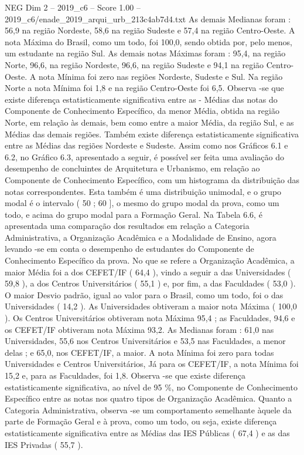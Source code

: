 \begin{textsample}{NEG Dim 2 – 2019\_c6 – Score 1.00 – 2019\_c6/enade\_2019\_arqui\_urb\_213c4ab7d4.txt}
As demais Medianas foram : 56,9 na região Nordeste, 58,6 na região Sudeste e 57,4 na região Centro-Oeste.
A nota Máxima do Brasil, como um todo, foi 100,0, sendo obtida por, pelo menos, um estudante na região Sul.
As demais notas Máximas foram : 95,4, na região Norte, 96,6, na região Nordeste, 96,6, na região Sudeste e 94,1 na região Centro-Oeste.
A nota Mínima foi zero nas regiões Nordeste, Sudeste e Sul.
Na região Norte a nota Mínima foi 1,8 e na região Centro-Oeste foi 6,5.
Observa -se que existe diferença estatisticamente significativa entre as - Médias das notas do Componente de Conhecimento Específico, da menor Média, obtida na região Norte, em relação às demais, bem como entre a maior Média, da região Sul, e as Médias das demais regiões.
Também existe diferença estatisticamente significativa entre as Médias das regiões Nordeste e Sudeste.
Assim como nos Gráficos 6.1 e 6.2, no Gráfico 6.3, apresentado a seguir, é possível ser feita uma avaliação do desempenho de concluintes de Arquitetura e Urbanismo, em relação ao Componente de Conhecimento Específico, com um histograma da distribuição das notas correspondentes.
Esta também é uma distribuição unimodal, e o grupo modal é o intervalo ( 50 ; 60 ], o mesmo do grupo modal da prova, como um todo, e acima do grupo modal para a Formação Geral.
Na Tabela 6.6, é apresentada uma comparação dos resultados em relação a Categoria Administrativa, a Organização Acadêmica e a Modalidade de Ensino, agora levando -se em conta o desempenho de estudantes do Componente de Conhecimento Específico da prova.
No que se refere a Organização Acadêmica, a maior Média foi a dos CEFET/IF ( 64,4 ), vindo a seguir a das Universidades ( 59,8 ), a dos Centros Universitários ( 55,1 ) e, por fim, a das Faculdades ( 53,0 ).
O maior Desvio padrão, igual ao valor para o Brasil, como um todo, foi o das Universidades ( 14,2 ).
As Universidades obtiveram a maior nota Máxima ( 100,0 ).
Os Centros Universitários obtiveram nota Máxima 95,4 ; as Faculdades, 94,6 e os CEFET/IF obtiveram nota Máxima 93,2.
As Medianas foram : 61,0 nas Universidades, 55,6 nos Centros Universitários e 53,5 nas Faculdades, a menor delas ; e 65,0, nos CEFET/IF, a maior.
A nota Mínima foi zero para todas Universidades e Centros Universitários, Já para os CEFET/IF, a nota Mínima foi 15,2 e, para as Faculdades, foi 1,8.
Observa -se que existe diferença estatisticamente significativa, ao nível de 95 \%, no Componente de Conhecimento Específico entre as notas nos quatro tipos de Organização Acadêmica.
Quanto a Categoria Administrativa, observa -se um comportamento semelhante àquele da parte de Formação Geral e à prova, como um todo, ou seja, existe diferença estatisticamente significativa entre as Médias das IES Públicas ( 67,4 ) e as das IES Privadas ( 55,7 ).

\end{textsample}
